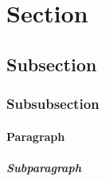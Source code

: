 \section{Section} \label{Section_ref}
\subsection{Subsection}
\subsubsection{Subsubsection}
\paragraph{Paragraph}
\subparagraph{Subparagraph}

